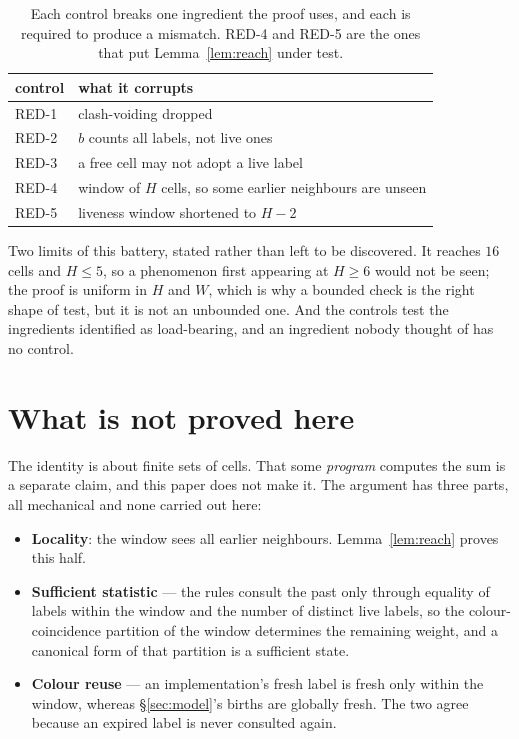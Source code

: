 \documentclass[11pt]{article}
\begin{document}
\begin{table}[H]
\centering\small
\begin{tabular}{l l}
\toprule
control & what it corrupts \\
\midrule
RED-1 & clash-voiding dropped \\
RED-2 & $b$ counts all labels, not live ones \\
RED-3 & a free cell may not adopt a live label \\
RED-4 & window of $H$ cells, so some earlier neighbours are unseen \\
RED-5 & liveness window shortened to $H-2$ \\
\bottomrule
\end{tabular}
\caption{Each control breaks one ingredient the proof uses, and each is required
to produce a mismatch. RED-4 and RED-5 are the ones that put
Lemma~\ref{lem:reach} under test.}
\label{tab:red}
\end{table}

Two limits of this battery, stated rather than left to be discovered. It reaches
$16$ cells and $H \le 5$, so a phenomenon first appearing at $H \ge 6$ would not
be seen; the proof is uniform in $H$ and $W$, which is why a bounded check is the
right shape of test, but it is not an unbounded one. And the controls test the
ingredients identified as load-bearing, and an ingredient nobody thought of has
no control.

\section{What is not proved here}
\label{sec:tier2}

The identity is about finite sets of cells. That some \emph{program} computes the
sum is a separate claim, and this paper does not make it. The argument has three
parts, all mechanical and none carried out here:

\begin{itemize}
\item \textbf{Locality}: the window sees all earlier neighbours.
  Lemma~\ref{lem:reach} proves this half.
\item \textbf{Sufficient statistic} --- the rules consult the past only through
  equality of labels within the window and the number of distinct live labels, so
  the colour-coincidence partition of the window determines the remaining weight,
  and a canonical form of that partition is a sufficient state.
\item \textbf{Colour reuse} --- an implementation's fresh label is fresh only
  within the window, whereas \S\ref{sec:model}'s births are globally fresh. The
  two agree because an expired label is never consulted again.
\end{itemize}
\end{document}
